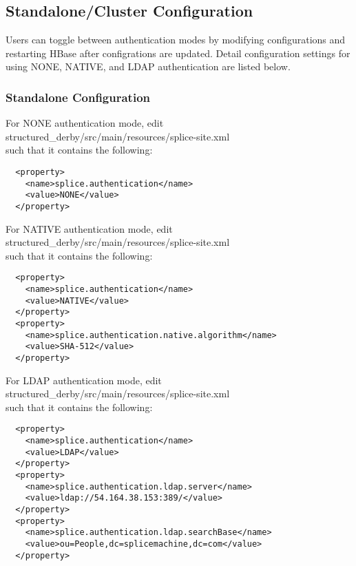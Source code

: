 \subsection{Standalone/Cluster Configuration}
Users can toggle between authentication modes by modifying configurations and restarting HBase after configrations are updated. Detail configuration settings for using NONE, NATIVE, and LDAP authentication are listed below. 

\subsubsection{Standalone Configuration}
For NONE authentication mode, edit \\ structured\_derby/src/main/resources/splice-site.xml \\ 
such that it contains the following:
\begin{lstlisting}
  <property> 
    <name>splice.authentication</name> 
    <value>NONE</value> 
  </property> 
\end{lstlisting}
For NATIVE authentication mode, edit \\ structured\_derby/src/main/resources/splice-site.xml \\ 
such that it contains the following: 
\begin{lstlisting}
  <property> 
    <name>splice.authentication</name> 
    <value>NATIVE</value> 
  </property> 
  <property> 
    <name>splice.authentication.native.algorithm</name> 
    <value>SHA-512</value> 
  </property> 
\end{lstlisting}
For LDAP authentication mode, edit \\ structured\_derby/src/main/resources/splice-site.xml \\ such that it contains the following: 
\begin{lstlisting}
  <property> 
    <name>splice.authentication</name> 
    <value>LDAP</value> 
  </property> 
  <property> 
    <name>splice.authentication.ldap.server</name> 
    <value>ldap://54.164.38.153:389/</value> 
  </property> 
  <property> 
    <name>splice.authentication.ldap.searchBase</name> 
    <value>ou=People,dc=splicemachine,dc=com</value> 
  </property> 
\end{lstlisting}

